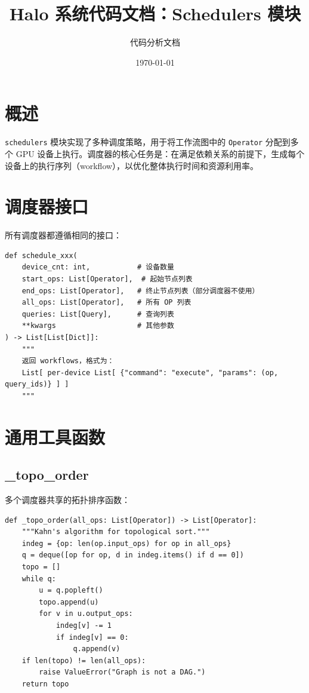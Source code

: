 \documentclass[12pt,a4paper]{article}
\title{Halo 系统代码文档：Schedulers 模块}
\author{代码分析文档}
\date{\today}
\begin{document}
\maketitle

\tableofcontents
\newpage

\section{概述}

\texttt{schedulers} 模块实现了多种调度策略，用于将工作流图中的 \texttt{Operator} 分配到多个 GPU 设备上执行。调度器的核心任务是：在满足依赖关系的前提下，生成每个设备上的执行序列（workflow），以优化整体执行时间和资源利用率。

\section{调度器接口}

所有调度器都遵循相同的接口：

\begin{lstlisting}
def schedule_xxx(
    device_cnt: int,           # 设备数量
    start_ops: List[Operator],  # 起始节点列表
    end_ops: List[Operator],   # 终止节点列表（部分调度器不使用）
    all_ops: List[Operator],   # 所有 OP 列表
    queries: List[Query],      # 查询列表
    **kwargs                   # 其他参数
) -> List[List[Dict]]:
    """
    返回 workflows，格式为：
    List[ per-device List[ {"command": "execute", "params": (op, query_ids)} ] ]
    """
\end{lstlisting}

\section{通用工具函数}

\subsection{\_topo\_order}

多个调度器共享的拓扑排序函数：

\begin{lstlisting}
def _topo_order(all_ops: List[Operator]) -> List[Operator]:
    """Kahn's algorithm for topological sort."""
    indeg = {op: len(op.input_ops) for op in all_ops}
    q = deque([op for op, d in indeg.items() if d == 0])
    topo = []
    while q:
        u = q.popleft()
        topo.append(u)
        for v in u.output_ops:
            indeg[v] -= 1
            if indeg[v] == 0:
                q.append(v)
    if len(topo) != len(all_ops):
        raise ValueError("Graph is not a DAG.")
    return topo
\end{lstlisting}
\end{document}
